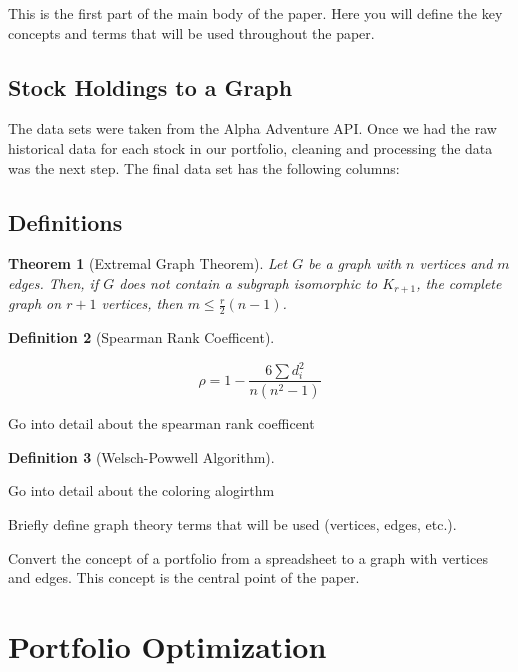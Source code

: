 \documentclass{article}
\newtheorem{theorem}{Theorem}[section]
\newtheorem{definition}[theorem]{Definition}
\begin{document}
This is the first part of the main body of the paper. Here you will define the key concepts and terms that will be used throughout the paper.

\subsection{Stock Holdings to a Graph}

The data sets were taken from the Alpha Adventure API. Once we had the raw historical data for each stock in our portfolio, cleaning and processing the data was the next step. The final data set has the following columns: 



\subsection{Definitions}


\begin{theorem}[Extremal Graph Theorem]
    Let $G$ be a graph with $n$ vertices and $m$ edges. Then, if $G$ does not contain a subgraph isomorphic to $K_{r+1}$, the complete graph on $r+1$ vertices, then $m \leq \frac{r}{2}(n-1)$.
\end{theorem}


\begin{definition}[Spearman Rank Coefficent]
\end{definition}

\[
\rho = 1 - \frac{6 \sum d_i^2}{n(n^2-1)}
\]

Go into detail about the spearman rank coefficent


\begin{definition}[Welsch-Powwell Algorithm]
\end{definition}

Go into detail about the coloring alogirthm



Briefly define graph theory terms that will be used (vertices, edges, etc.). 


Convert the concept of a portfolio from a spreadsheet to a graph with vertices and edges. This concept is the central point of the paper.


\section{Portfolio Optimization}
\end{document}
